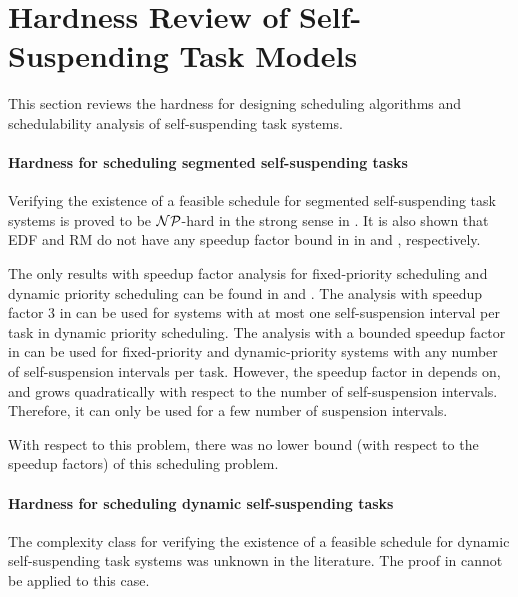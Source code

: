 \section{Hardness Review of Self-Suspending Task Models}
This section reviews the hardness for designing scheduling algorithms and schedulability analysis of self-suspending task systems. 

\paragraph{Hardness for scheduling segmented self-suspending tasks}
Verifying the existence of a feasible schedule for segmented self-suspending task systems is proved to be ${\cal NP}$-hard in the strong sense in \cite{Ridouard_2004}. It is also shown that EDF and RM do not have any speedup factor bound in in \cite{Ridouard_2004} and \cite{RTSS-ChenL14}, respectively. 

The only results with speedup factor analysis for fixed-priority scheduling and dynamic priority scheduling can be found in \cite{RTSS-ChenL14} and \cite{WC16-suspend-DATE}. The analysis with speedup factor $3$ in \cite{RTSS-ChenL14} can be used for systems with at most one self-suspension interval per task in dynamic priority scheduling. The analysis with a bounded speedup factor in \cite{WC16-suspend-DATE} can be used for fixed-priority and dynamic-priority systems with any number of self-suspension intervals per task. However, the speedup factor in \cite{WC16-suspend-DATE} depends on, and grows quadratically with respect to the number of self-suspension intervals. Therefore, it can only be used for a few number of suspension intervals. 

With respect to this problem, there was no lower bound (with respect to the speedup factors) of this scheduling problem. 

\paragraph{Hardness for scheduling dynamic self-suspending tasks}
The complexity class for verifying the existence of a feasible schedule for dynamic self-suspending task systems was unknown in the literature. The proof in \cite{Ridouard_2004} cannot be applied to this case. 


